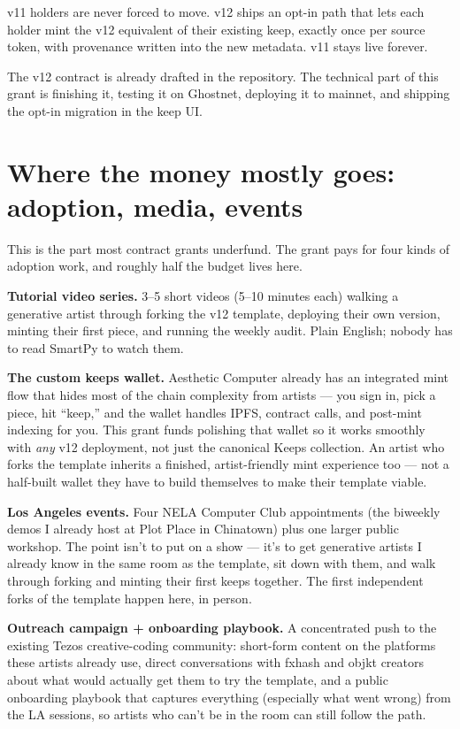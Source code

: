 \documentclass[11pt]{article}
\begin{document}
v11 holders are never forced to move. v12 ships an opt-in path that lets each holder mint the v12 equivalent of their existing keep, exactly once per source token, with provenance written into the new metadata. v11 stays live forever.

The v12 contract is already drafted in the repository. The technical part of this grant is finishing it, testing it on Ghostnet, deploying it to mainnet, and shipping the opt-in migration in the keep UI.

\section*{Where the money mostly goes: adoption, media, events}

This is the part most contract grants underfund. The grant pays for four kinds of adoption work, and roughly half the budget lives here.

\textbf{Tutorial video series.} 3--5 short videos (5--10 minutes each) walking a generative artist through forking the v12 template, deploying their own version, minting their first piece, and running the weekly audit. Plain English; nobody has to read SmartPy to watch them.

\textbf{The custom keeps wallet.} Aesthetic Computer already has an integrated mint flow that hides most of the chain complexity from artists --- you sign in, pick a piece, hit ``keep,'' and the wallet handles IPFS, contract calls, and post-mint indexing for you. This grant funds polishing that wallet so it works smoothly with \emph{any} v12 deployment, not just the canonical Keeps collection. An artist who forks the template inherits a finished, artist-friendly mint experience too --- not a half-built wallet they have to build themselves to make their template viable.

\textbf{Los Angeles events.} Four NELA Computer Club appointments (the biweekly demos I already host at Plot Place in Chinatown) plus one larger public workshop. The point isn't to put on a show --- it's to get generative artists I already know in the same room as the template, sit down with them, and walk through forking and minting their first keeps together. The first independent forks of the template happen here, in person.

\textbf{Outreach campaign + onboarding playbook.} A concentrated push to the existing Tezos creative-coding community: short-form content on the platforms these artists already use, direct conversations with fxhash and objkt creators about what would actually get them to try the template, and a public onboarding playbook that captures everything (especially what went wrong) from the LA sessions, so artists who can't be in the room can still follow the path.
\end{document}
